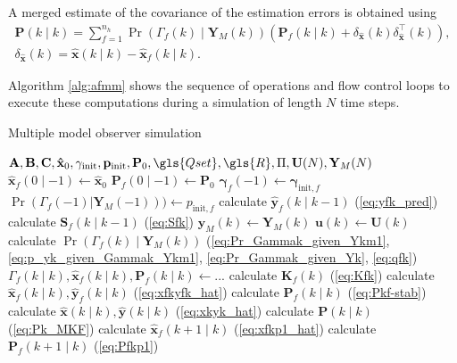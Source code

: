 A merged estimate of the covariance of the estimation errors is obtained using
\begin{equation} \label{eq:Pk_MKF}
	\begin{aligned}
	\mathbf{P}(k \mid k) = \sum_{f=1}^{n_h} \Pr(\Gamma_f(k) \mid \mathbf{Y}_M(k)) \left( \mathbf{P}_f(k \mid k) + \delta_\mathbf{\hat{x}}(k) \delta_\mathbf{\hat{x}}^\intercal(k) \right), \\
	\delta_\mathbf{\hat{x}}(k) = \mathbf{\hat{x}}(k \mid k) - \mathbf{\hat{x}}_f(k \mid k).
	\end{aligned}
\end{equation}

Algorithm \ref{alg:afmm} shows the sequence of operations and flow control loops to execute these computations during a simulation of length $N$ time steps.
%
\begin{algorithm}
	\caption{Multiple model observer simulation}  \label{alg:afmm}
	\begin{algorithmic}
			\Require $\mathbf{A}, \mathbf{B}, \mathbf{C}, \mathbf{\hat{x}}_0, \mathbf{\gamma}_{\text{init}}, \mathbf{p}_{\text{init}}, \mathbf{P}_0, \gls{Qset}, \gls{R}, \Pi, \mathbf{U}(N), \mathbf{Y}_M(N)$
				\State $\mathbf{\hat{x}}_f(0 \mid -1) \gets \mathbf{\hat{x}}_0$
				\State $\mathbf{P}_f(0 \mid -1) \gets \mathbf{P}_0$
				\State $\mathbf{\gamma}_f(-1) \gets \mathbf{\gamma}_{\text{init},f}$
				\State $\Pr(\Gamma_f(-1)|\mathbf{Y}_M(-1))) \gets p_{\text{init},f}$
			\EndFor
				\State calculate $\mathbf{\hat{y}}_f(k \mid k-1)$ (\ref{eq:yfk_pred}) 
				\State calculate $\mathbf{S}_f(k \mid k-1)$ (\ref{eq:Sfk})
			\EndFor
			\State $\mathbf{y}_M(k) \gets \mathbf{Y}_M(k)$   %
			\State $\mathbf{u}(k) \gets \mathbf{U}(k)$
				\State calculate $\Pr(\Gamma_f(k) \mid \mathbf{Y}_M(k))$ (\ref{eq:Pr_Gammak_given_Ykm1}, \ref{eq:p_yk_given_Gammak_Ykm1}, \ref{eq:Pr_Gammak_given_Yk}, \ref{eq:qfk})       %
			\EndFor
			\State $\Gamma_f(k \mid k), \mathbf{\hat{x}}_f(k \mid k), \mathbf{P}_f(k \mid k) \gets ...$   %
				\State calculate $\mathbf{K}_f(k)$ (\ref{eq:Kfk}) 
				\State calculate $\mathbf{\hat{x}}_f(k \mid k), \mathbf{\hat{y}}_f(k \mid k)$ (\ref{eq:xfkyfk_hat})
				\State calculate $\mathbf{P}_f(k \mid k)$ (\ref{eq:Pkf-stab})
			\EndFor
			\State calculate $\mathbf{\hat{x}}(k \mid k), \mathbf{\hat{y}}(k \mid k)$ (\ref{eq:xkyk_hat}) 
			\State calculate $\mathbf{P}(k \mid k)$ (\ref{eq:Pk_MKF})   %
				\State calculate $\mathbf{\hat{x}}_f(k+1 \mid k)$ (\ref{eq:xfkp1_hat}) 
				\State calculate $\mathbf{P}_f(k+1 \mid k)$ (\ref{eq:Pfkp1})
			\EndFor
			\EndFor
		\end{algorithmic}
\end{algorithm}

